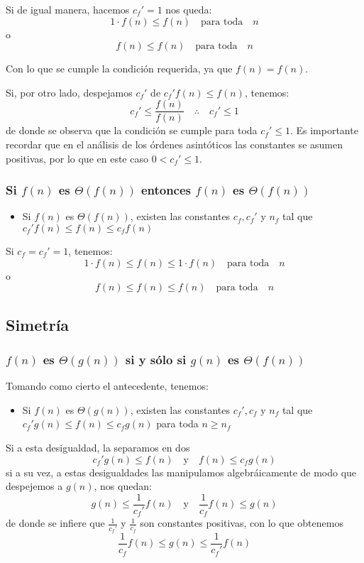 \documentclass[letterpaper]{article}
\begin{document}
\noindent
Si de igual manera, hacemos \(c_f' = 1\) nos queda:
$$
1 \cdot f(n) \leq f(n) \quad \mbox{para toda} \quad n
$$
o
$$
f(n) \leq f(n) \quad \mbox{para toda} \quad n
$$

\noindent
Con lo que se cumple la condición requerida, ya que \(f(n) = f(n)\).

\noindent
Si, por otro lado, despejamos \(c_f'\) de \(c_f' f(n) \leq f(n)\), tenemos:
$$
c_f' \leq \frac{f(n)}{f(n)} \quad \therefore \quad c_f' \leq 1
$$
de donde se observa que la condición se cumple para toda \(c_f' \leq 1\). Es
importante recordar que en el análisis de los órdenes asintóticos las constantes
se asumen positivas, por lo que en este caso \(0 < c_f' \leq 1\).
\subsubsection{Si \(f(n)\) es \(\Theta(f(n))\) entonces \(f(n)\) es \(\Theta(f(n))\)}
\label{sec:orgdb0c2ff}
\begin{itemize}
\item Si \(f(n)\) es \(\Theta(f(n))\), existen las constantes \(c_f, c_f'\) y \(n_f\) tal
que \(c_f' f(n) \leq f(n) \leq c_f f(n)\)
\end{itemize}

\noindent
Si \(c_f = c_f' = 1\), tenemos:
$$
1 \cdot f(n) \leq f(n) \leq 1 \cdot f(n) \quad \mbox{para toda} \quad n
$$
o
$$
f(n) \leq f(n) \leq f(n) \quad \mbox{para toda} \quad n
$$
\subsection{Simetría}
\label{sec:org389def5}
\subsubsection{\(f(n)\) es \(\Theta(g(n))\) si y sólo si \(g(n)\) es \(\Theta(f(n))\)}
\label{sec:org792f820}
Tomando como cierto el antecedente, tenemos:
\begin{itemize}
\item Si \(f(n)\) es \(\Theta(g(n))\), existen las constantes \(c_f', c_f\) y \(n_f\) tal
que \(c_f' g(n) \leq f(n) \leq c_f g(n)\) para toda \(n \geq n_f\)
\end{itemize}

\noindent
Si a esta desigualdad, la separamos en dos
$$
c_f' g(n) \leq f(n) \quad \mbox{y} \quad f(n) \leq c_f g(n)
$$
si a su vez, a estas desigualdades las manipulamos algebráicamente de modo que
despejemos a \(g(n)\), nos quedan:
$$
g(n) \leq \frac{1}{c_f'} f(n) \quad \mbox{y} \quad \frac{1}{c_f} f(n) \leq g(n)
$$
de donde se infiere que \(\frac{1}{c_f'}\) y \(\frac{1}{c_f}\) son constantes
positivas, con lo que obtenemos
$$
\frac{1}{c_f} f(n) \leq g(n) \leq \frac{1}{c_f'} f(n)
$$
\end{document}

